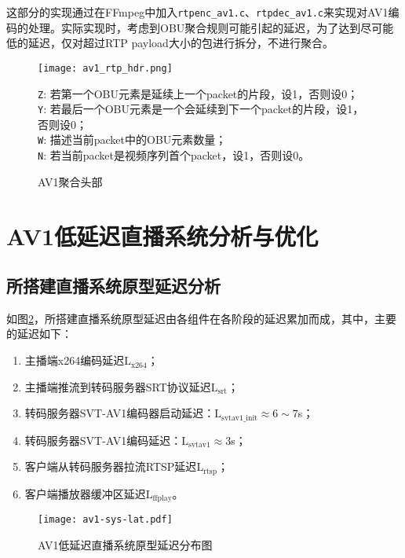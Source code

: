 	这部分的实现通过在FFmpeg中加入\texttt{rtpenc\_av1.c}、\texttt{rtpdec\_av1.c}来实现对AV1编码的处理。实际实现时，考虑到OBU聚合规则可能引起的延迟，为了达到尽可能低的延迟，仅对超过RTP payload大小的包进行拆分，不进行聚合。

	\begin{figure}[!htp]
		\centering
		\texttt{[image: av1\_rtp\_hdr.png]} \\
		\raggedright
		\texttt{Z}: 若第一个OBU元素是延续上一个packet的片段，设1，否则设0；\\
		\texttt{Y}: 若最后一个OBU元素是一个会延续到下一个packet的片段，设1，否则设0；\\
		\texttt{W}: 描述当前packet中的OBU元素数量；\\
		\texttt{N}: 若当前packet是视频序列首个packet，设1，否则设0。\\
		\caption{AV1聚合头部}
		\label{fig:av1rtp-aggr}
	\end{figure}
\section{AV1低延迟直播系统分析与优化}

\subsection{所搭建直播系统原型延迟分析}
	如图\ref{fig:av1-sys-lat}，所搭建直播系统原型延迟由各组件在各阶段的延迟累加而成，其中，主要的延迟如下：
	\begin{enumerate} [label=\arabic*)]
		\item 主播端x264编码延迟$\mathrm{L_{x264}}$；
		\item 主播端推流到转码服务器SRT协议延迟$\mathrm{L_{srt}}$；
		\item 转码服务器SVT-AV1编码器启动延迟：$\mathrm{L_{svtav1\_init}}\approx6\sim 7$s；
		\item 转码服务器SVT-AV1编码延迟：$\mathrm{L_{svtav1}}\approx 3$s；
		\item 客户端从转码服务器拉流RTSP延迟$\mathrm{L_{rtsp}}$；
		\item 客户端播放器缓冲区延迟$\mathrm{L_{ffplay}}$。
	\end{enumerate}

  \begin{figure}[!htp]
		\centering
		\texttt{[image: av1-sys-lat.pdf]}
		\caption{AV1低延迟直播系统原型延迟分布图}
		\label{fig:av1-sys-lat}
	\end{figure}


